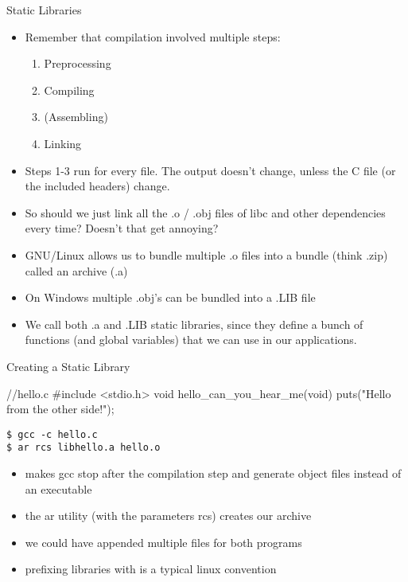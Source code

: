 \documentclass[10pt,graphics,aspectratio=169,table]{beamer}
\begin{document}
\begin{frame}{Static Libraries}
    \begin{itemize}
        \item Remember that compilation involved multiple steps:
        \begin{enumerate}
            \item Preprocessing
            \item Compiling
            \item (Assembling)
            \item Linking
        \end{enumerate}
        \item Steps 1-3 run for every file. The output doesn't change, unless
            the C file (or the included headers) change.
        \item So should we just link all the .o / .obj files of libc and other
            dependencies every time? Doesn't that get annoying?
        \item GNU/Linux allows us to bundle multiple .o files into a bundle 
            (think .zip) called an archive (.a)
        \item On Windows multiple .obj's can be bundled into a .LIB file
        \item We call both .a and .LIB static libraries, since they define
            a bunch of functions (and global variables) that we can use 
            in our applications. 
    \end{itemize}
\end{frame}

\begin{frame}[fragile]{Creating a Static Library}
    \begin{codeblock}
//hello.c
#include <stdio.h>
void hello_can_you_hear_me(void){
    puts("Hello from the other side!");
}
    \end{codeblock}
    \begin{lstlisting}
$ gcc -c hello.c 
$ ar rcs libhello.a hello.o     
    \end{lstlisting}
    \begin{itemize}
        \item {} makes gcc stop after the compilation step and generate
            object files instead of an executable
        \item  the ar utility (with the parameters rcs) creates our archive
        \item we could have appended multiple files for both programs 
        \item prefixing libraries with  is a typical linux convention
    \end{itemize}
\end{frame}
\end{document}
